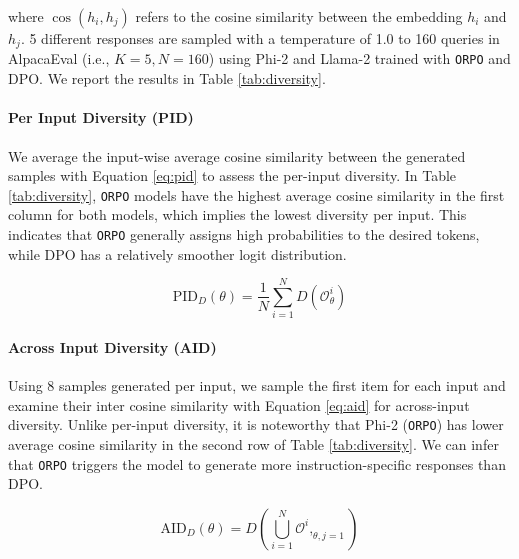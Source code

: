 where $\cos(h_i, h_j)$ refers to the cosine similarity between the embedding $h_i$ and $h_j$. 5 different responses are sampled with a temperature of 1.0 to 160 queries in AlpacaEval (i.e., $K=5, N=160$) using Phi-2 and Llama-2 trained with \texttt{ORPO} and DPO. We report the results in Table \ref{tab:diversity}.

\paragraph{Per Input Diversity (PID)} We average the input-wise average cosine similarity between the generated samples with Equation \ref{eq:pid} to assess the per-input diversity. In Table \ref{tab:diversity}, \texttt{ORPO} models have the highest average cosine similarity in the first column for both models, which implies the lowest diversity per input. This indicates that \texttt{ORPO} generally assigns high probabilities to the desired tokens, while DPO has a relatively smoother logit distribution.

\begin{equation}
    \text{PID}_D(\theta) = \frac{1}{N}\sum_{i=1}^N D(\mathcal{O}^i_\theta)\label{eq:pid}
\end{equation}

\paragraph{Across Input Diversity (AID)} Using 8 samples generated per input, we sample the first item for each input and examine their inter cosine similarity with Equation \ref{eq:aid} for across-input diversity. Unlike per-input diversity, it is noteworthy that Phi-2 (\texttt{ORPO}) has lower average cosine similarity in the second row of Table \ref{tab:diversity}. We can infer that \texttt{ORPO} triggers the model to generate more instruction-specific responses than DPO.

\begin{equation}
    \text{AID}_D(\theta) = D \left( \bigcup\limits_{i=1}^{N}\mathcal{O}^i, _{\theta, j=1} \right)\label{eq:aid}
\end{equation}

